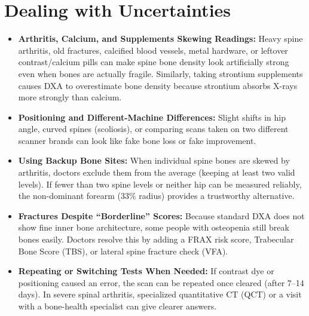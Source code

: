 \section{Dealing with Uncertainties}
\begin{itemize}
\item \textbf{Arthritis, Calcium, and Supplements Skewing Readings:} Heavy spine arthritis, old fractures, calcified blood vessels, metal hardware, or leftover contrast/calcium pills can make spine bone density look artificially strong even when bones are actually fragile. Similarly, taking strontium supplements causes DXA to overestimate bone density because strontium absorbs X-rays more strongly than calcium.
\item \textbf{Positioning and Different-Machine Differences:} Slight shifts in hip angle, curved spines (scoliosis), or comparing scans taken on two different scanner brands can look like fake bone loss or fake improvement.
\item \textbf{Using Backup Bone Sites:} When individual spine bones are skewed by arthritis, doctors exclude them from the average (keeping at least two valid levels). If fewer than two spine levels or neither hip can be measured reliably, the non-dominant forearm (33\% radius) provides a trustworthy alternative.
\item \textbf{Fractures Despite ``Borderline'' Scores:} Because standard DXA does not show fine inner bone architecture, some people with osteopenia still break bones easily. Doctors resolve this by adding a FRAX risk score, Trabecular Bone Score (TBS), or lateral spine fracture check (VFA).
\item \textbf{Repeating or Switching Tests When Needed:} If contrast dye or positioning caused an error, the scan can be repeated once cleared (after 7--14 days). In severe spinal arthritis, specialized quantitative CT (QCT) or a visit with a bone-health specialist can give clearer answers.
\end{itemize}

